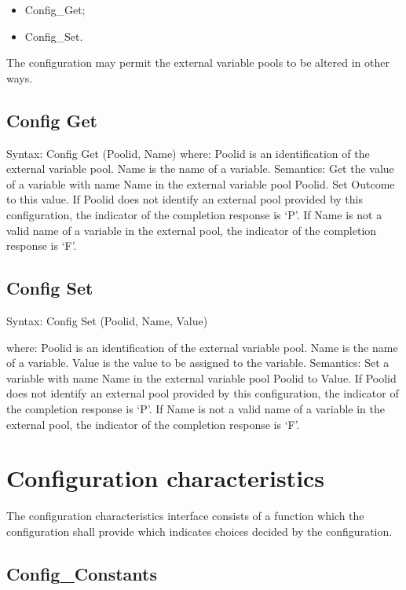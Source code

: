 \begin{itemize}
\item
  Config\_Get;
\item
  Config\_Set.
\end{itemize}

The configuration may permit the external variable pools to be altered
in other ways.

\hypertarget{config-get}{%
\subsection{Config Get}\label{config-get}}

Syntax: Config Get (Poolid, Name) where: Poolid is an identification of
the external variable pool. Name is the name of a variable. Semantics:
Get the value of a variable with name Name in the external variable pool
Poolid. Set Outcome to this value. If Poolid does not identify an
external pool provided by this configuration, the indicator of the
completion response is `P'. If Name is not a valid name of a variable in
the external pool, the indicator of the completion response is `F'.

\hypertarget{config-set}{%
\subsection{Config Set}\label{config-set}}

Syntax: Config Set (Poolid, Name, Value)

where: Poolid is an identification of the external variable pool. Name
is the name of a variable. Value is the value to be assigned to the
variable. Semantics: Set a variable with name Name in the external
variable pool Poolid to Value. If Poolid does not identify an external
pool provided by this configuration, the indicator of the completion
response is `P'. If Name is not a valid name of a variable in the
external pool, the indicator of the completion response is `F'.

\hypertarget{configuration-characteristics}{%
\section{Configuration
characteristics}\label{configuration-characteristics}}

The configuration characteristics interface consists of a function which
the configuration shall provide which indicates choices decided by the
configuration.

\hypertarget{config_constants}{%
\subsection{Config\_Constants}\label{config_constants}}

